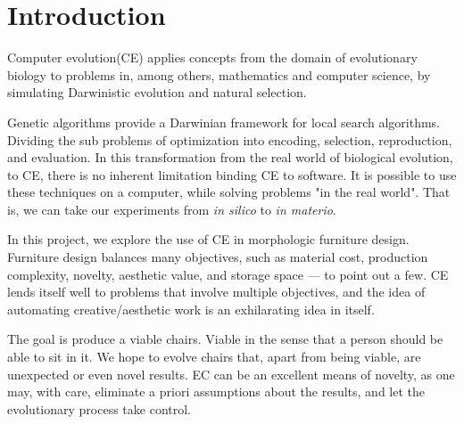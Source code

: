 \section{Introduction}
Computer evolution(CE) applies concepts from the domain of evolutionary
biology to problems in, among others, mathematics and computer science,
by simulating Darwinistic evolution and natural selection.

Genetic algorithms provide a Darwinian framework for local search algorithms.
Dividing the sub problems of optimization into encoding, selection,
reproduction, and evaluation. In this transformation from the real world of
biological evolution, to CE, there is no inherent limitation binding CE to
software. It is possible to use these techniques on a computer, while solving
problems "in the real world". That is, we can take our experiments from
\emph{in silico} to \emph{in materio}\cite{paper:ev3}.

In this project, we explore the use of CE in morphologic furniture design.
Furniture design balances many objectives, such as material cost, production
complexity, novelty, aesthetic value, and storage space --- to point out a few.
CE lends itself well to problems that involve multiple objectives, and the idea
of automating creative/aesthetic work is an exhilarating idea in itself.

The goal is produce a viable chairs. Viable in the sense that a person should be
able to sit in it. We hope to evolve chairs that, apart from being viable,
are unexpected or even novel results. EC can be an excellent means of novelty,
as one may, with care, eliminate a priori assumptions about the results, and let
the evolutionary process take control.

